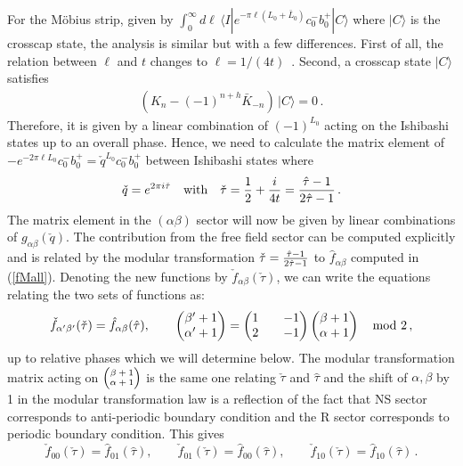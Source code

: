 \documentclass[12pt,a4paper]{article}
\newcommand{\be}{\begin{equation}}
\newcommand{\ee}{\end{equation}}
\newcommand{\refb}[1]{(\ref{#1})}
\def\htau{\hat\tau}
\def\ctau{\check\tau}
\begin{document}
For the M\"{o}bius strip, given by
$\int_0^\infty d\ell \,\langle I|e^{-\pi \ell (L_0+\bar L_0)} c_0^- b_0^+ |C\rangle$
where $|C\rangle$ is the crosscap state, the analysis is similar but with a few differences.
First of all, the relation between $\ell$ and $t$ changes to
$\ell=1/(4t)$~\cite{Polchinski:1998rq}. Second,
a crosscap state $|C\rangle$ satisfies
\begin{align}
	(K_n - (-1)^{n+h} \bar K_{-n}) \, |C\rangle=0 \, .
\end{align}
Therefore, it is given by a linear combination of $(-1)^{L_0}$ acting on the Ishibashi
states up to an overall phase. Hence, we need to calculate the matrix element of
$-e^{-2\pi \ell L_0} c_0^- b_0^+=\check q^{L_0} c_0^- b_0^+$ between Ishibashi states where
\begin{align}
	\check q=e^{2\pi i\ctau} \quad \text{with} \quad \ctau={1\over 2}+{i\over 4t} = {\htau-1\over 2\htau -1} \, .
\end{align}
The matrix element in the $(\alpha\beta)$ sector will now be given by linear
combinations of $g_{\alpha\beta}(\check q)$.
The contribution from the free field sector can be computed explicitly
and is related by the modular transformation $\ctau= {\htau-1\over 2\htau -1}$
to $\hat f_{\alpha\beta}$ computed in \refb{fMall}.
Denoting the new functions by $\check f_{\alpha\beta}(\ctau)$,
we can write the equations relating the two sets of functions as:
\be
\check f_{\alpha'\beta'}(\ctau) =\hat f_{\alpha\beta}(\htau),
\qquad \begin{pmatrix} \beta'+1\\ \alpha'+1 \end{pmatrix}
= \begin{pmatrix} 1 & & -1\\ 2 && -1 \end{pmatrix} \begin{pmatrix} \beta+1\\ \alpha+1 \end{pmatrix} \quad \hbox{mod 2}\, ,
\ee
up to relative phases which we will determine below.
The modular transformation matrix acting on $\scriptsize\begin{pmatrix} \beta+1\\ \alpha+1 \end{pmatrix}$
is the same one relating $\ctau$ and $\hat\tau$
and the shift of $\alpha,\beta$ by 1 in the modular transformation law is a reflection
of the fact that NS sector corresponds to anti-periodic boundary condition and the R sector
corresponds to periodic boundary condition. This gives
\be \label{frelation}
\check f_{00}(\ctau)= \hat f_{01}(\hat\tau),
\qquad
\check f_{01}(\ctau)= \hat f_{00}(\hat\tau),
\qquad
\check f_{10}(\ctau)= \hat f_{10}(\hat\tau)\, .
\ee
\end{document}
